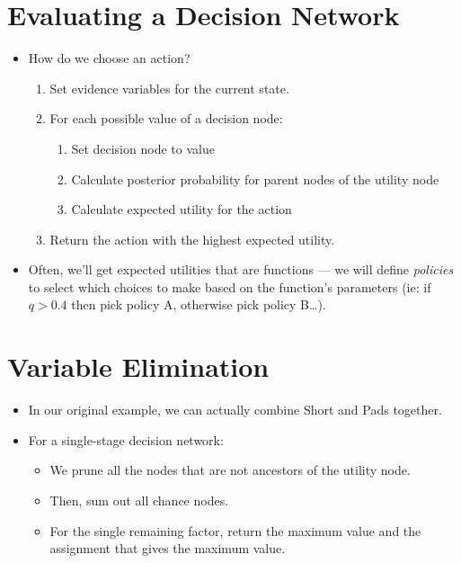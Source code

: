 \documentclass{article}
\begin{document}
\section{Evaluating a Decision Network}
\begin{itemize}
    \item How do we choose an action?
        \begin{enumerate}
            \item Set evidence variables for the current state.
            \item For each possible value of a decision node:
                \begin{enumerate}
                    \item Set decision node to value
                    \item Calculate posterior probability for parent nodes of the utility node
                    \item Calculate expected utility for the action
                \end{enumerate}
            \item Return the action with the highest expected utility.
    \end{enumerate}
    \item Often, we'll get expected utilities that are functions --- we will define \emph{policies} to select which choices to make based on the function's parameters (ie: if $q > 0.4$ then pick policy A, otherwise pick policy B\dots).
\end{itemize}

\section{Variable Elimination}
\begin{itemize}
    \item In our original example, we can actually combine Short and Pads together.
    \item For a single-stage decision network:
        \begin{itemize}
            \item We prune all the nodes that are not ancestors of the utility node.
            \item Then, sum out all chance nodes.
            \item For the single remaining factor, return the maximum value and the assignment that gives the maximum value.
        \end{itemize}
\end{itemize}
\end{document}
